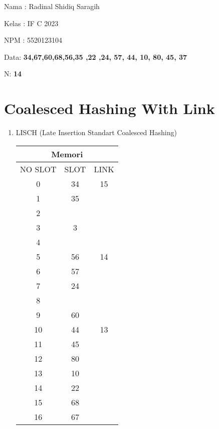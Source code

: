\documentclass[12pt,a4paper]{article}
\date{}
\begin{document}
Nama : Radinal Shidiq Saragih

Kelas : IF C 2023

NPM : 5520123104

\vspace{1cm}

\begin{center}
Data: \textbf{34,67,60,68,56,35 ,22 ,24, 57, 44, 10, 80, 45, 37}

N: \textbf{14}
\end{center}

\section{Coalesced Hashing With Link}

\begin{enumerate}

  \item LISCH (Late Insertion Standart Coalesced Hashing)

    \begin{multicols}{2}

      \begin{center}
        \begin{adjustbox}{scale=1,center}
          \begin{tabular}{ |c|c|c| } 
            \hline \multicolumn{3}{|c|}{Memori} \\ \hline \hline 
            NO SLOT & SLOT & LINK \\ \hline \hline
            0       & 34   &  15  \\ \hline
            1       & 35   &      \\ \hline
            2       &      &      \\ \hline
            3       & 3    &      \\ \hline
            4       &      &      \\ \hline
            5       & 56   &  14  \\ \hline
            6       & 57   &      \\ \hline
            7       & 24   &      \\ \hline
            8       &      &      \\ \hline
            9       & 60   &      \\ \hline
            10      & 44   &  13  \\ \hline
            11      & 45   &      \\ \hline
            12      & 80   &      \\ \hline
            13      & 10   &      \\ \hline
            14      & 22   &      \\ \hline
            15      & 68   &      \\ \hline
            16      & 67   &      \\ \hline


\end{tabular}
\end{adjustbox}
\end{center}
\end{multicols}
\end{enumerate}
\end{document}
